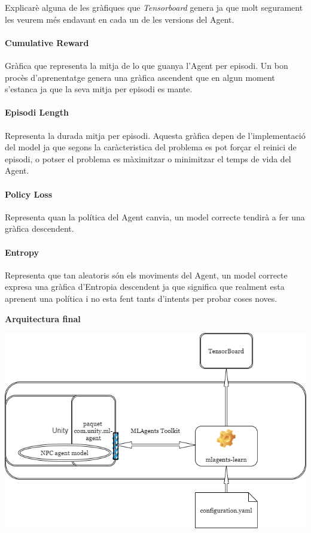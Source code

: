 \documentclass{article}
\begin{document}
    Explicarè alguna de les gràfiques que \textit{Tensorboard} genera ja que molt segurament les veurem més endavant en cada un de les versions del Agent.
    
    \paragraph{Cumulative Reward}
    Gràfica que representa la mitja de lo que guanya l'Agent per episodi. Un bon procès d'aprenentatge genera una gràfica ascendent que en algun moment s'estanca ja que la seva mitja per episodi es mante.
    
    \paragraph{Episodi Length}
    Representa la durada mitja per episodi. Aquesta gràfica depen de l'implementació del model ja que segons la caràcteristica del problema es pot forçar el reinici de episodi, o potser el problema es màximitzar o minimitzar el temps de vida del Agent.
    
    \paragraph{Policy Loss}
    Representa quan la política del Agent canvia, un model correcte tendirà a fer una gràfica descendent.
    
    \paragraph{Entropy}
    Representa que tan aleatoris són els moviments del Agent, un model correcte expresa una gràfica d'Entropia descendent ja que significa que realment esta aprenent una política i no esta fent tants d'intents per probar coses noves.
    
    \newpage
    
    \textbf{Arquitectura final}
    
    \includegraphics[width=\textwidth]{images/arquitectura-tools.drawio.png} 
    
\end{document}
